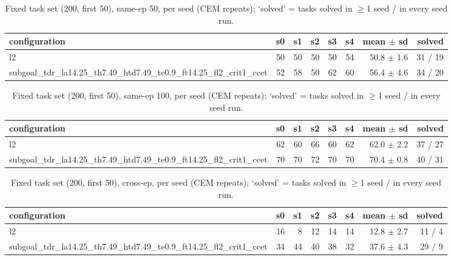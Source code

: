 \begin{table}[H]
\centering\small
\caption{Fixed task set (200, first 50), same-ep 50, per seed (CEM repeats); `solved' = tasks solved in $\ge$1 seed / in every seed run.}
\label{tab:gas-mpc-pooled-same50-task200-n50}
\begin{tabular}{lrrrrrrr}
\toprule
configuration & s0 & s1 & s2 & s3 & s4 & mean $\pm$ sd & solved \\
\midrule
l2 & 50 & 50 & 50 & 50 & 54 & 50.8 $\pm$ 1.6 & 31 / 19 \\
subgoal\_tdr\_la14.25\_th7.49\_htd7.49\_te0.9\_ft14.25\_fl2\_crit1\_ccet & 52 & 58 & 50 & 62 & 60 & 56.4 $\pm$ 4.6 & 34 / 20 \\
\bottomrule
\end{tabular}
\end{table}

\begin{table}[H]
\centering\small
\caption{Fixed task set (200, first 50), same-ep 100, per seed (CEM repeats); `solved' = tasks solved in $\ge$1 seed / in every seed run.}
\label{tab:gas-mpc-pooled-same100-task200-n50}
\begin{tabular}{lrrrrrrr}
\toprule
configuration & s0 & s1 & s2 & s3 & s4 & mean $\pm$ sd & solved \\
\midrule
l2 & 62 & 60 & 66 & 60 & 62 & 62.0 $\pm$ 2.2 & 37 / 27 \\
subgoal\_tdr\_la14.25\_th7.49\_htd7.49\_te0.9\_ft14.25\_fl2\_crit1\_ccet & 70 & 70 & 72 & 70 & 70 & 70.4 $\pm$ 0.8 & 40 / 31 \\
\bottomrule
\end{tabular}
\end{table}

\begin{table}[H]
\centering\small
\caption{Fixed task set (200, first 50), cross-ep, per seed (CEM repeats); `solved' = tasks solved in $\ge$1 seed / in every seed run.}
\label{tab:gas-mpc-pooled-cross-task200-n50}
\begin{tabular}{lrrrrrrr}
\toprule
configuration & s0 & s1 & s2 & s3 & s4 & mean $\pm$ sd & solved \\
\midrule
l2 & 16 & 8 & 12 & 14 & 14 & 12.8 $\pm$ 2.7 & 11 / 4 \\
subgoal\_tdr\_la14.25\_th7.49\_htd7.49\_te0.9\_ft14.25\_fl2\_crit1\_ccet & 34 & 44 & 40 & 38 & 32 & 37.6 $\pm$ 4.3 & 29 / 9 \\
\bottomrule
\end{tabular}
\end{table}
